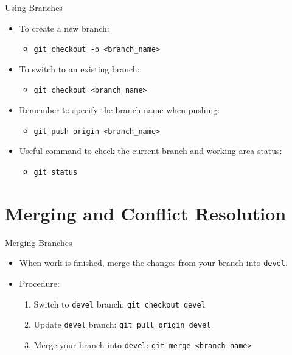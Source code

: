 \begin{frame}{Using Branches}
  \begin{itemize}
    \item To create a new branch:
      \begin{itemize}
        \item \texttt{git checkout -b <branch\_name>}
      \end{itemize}
    \item To switch to an existing branch:
      \begin{itemize}
        \item \texttt{git checkout <branch\_name>}
      \end{itemize}
    \item Remember to specify the branch name when pushing:
      \begin{itemize}
        \item \texttt{git push origin <branch\_name>}
      \end{itemize}
    \item Useful command to check the current branch and working area status:
      \begin{itemize}
        \item \texttt{git status}
      \end{itemize}
  \end{itemize}
\end{frame}

\section{Merging and Conflict Resolution}

\begin{frame}{Merging Branches}
  \begin{itemize}
    \item When work is finished, merge the changes from your branch into \texttt{devel}.
    \item Procedure: 
        \begin{enumerate}
            \item Switch to \texttt{devel} branch: \texttt{git checkout devel}
            \item Update \texttt{devel} branch: \texttt{git pull origin devel}
            \item Merge your branch into \texttt{devel}: \texttt{git merge <branch\_name>}
      \end{enumerate}
  \end{itemize}
\end{frame}

